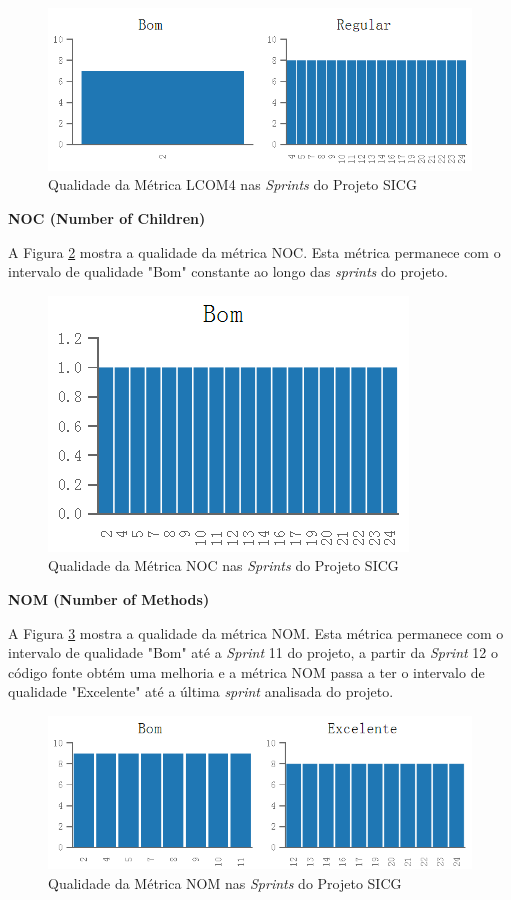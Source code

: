 \begin{figure}[H]
		\centering
			\includegraphics[scale=0.9]{figuras/lcom4.png}
		\caption{Qualidade da Métrica LCOM4  nas \textit{Sprints} do Projeto SICG}
		\label{lcom4}
\end{figure}

\textbf{NOC (Number of Children)}

A Figura \ref{noc} mostra a qualidade da métrica NOC. Esta métrica permanece com o intervalo de qualidade "Bom" constante ao longo das \textit{sprints} do projeto.

\begin{figure}[H]
		\centering
			\includegraphics[scale=1.0]{figuras/noc.png}
		\caption{Qualidade da Métrica NOC nas \textit{Sprints} do Projeto SICG}
		\label{noc}
\end{figure}


\textbf{NOM (Number of Methods)} 

A Figura \ref{nom} mostra a qualidade da métrica NOM. Esta métrica permanece com o intervalo de qualidade "Bom" até a \textit{Sprint} 11 do projeto, a partir da \textit{Sprint} 12 o código fonte obtém uma melhoria e a métrica NOM passa a ter o intervalo de qualidade "Excelente" até a última \textit{sprint} analisada do projeto.

\begin{figure}[H]
		\centering
			\includegraphics[scale=0.9]{figuras/nom.png}
		\caption{Qualidade da Métrica NOM nas \textit{Sprints} do Projeto SICG}
		\label{nom}
\end{figure}

